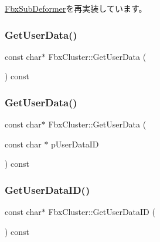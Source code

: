\hyperlink{class_fbx_sub_deformer_a80652fd0521b2ea1897e221e5ae1b5cf}{Fbx\+Sub\+Deformer}を再実装しています。

\mbox{\label{class_fbx_cluster_afd18bfe36ed5844ad6710629a68dc54f}} 
\subsubsection{\texorpdfstring{Get\+User\+Data()}{GetUserData()}\hspace{0.1cm}{\footnotesize\ttfamily [1/2]}}
{\footnotesize\ttfamily const char$\ast$ Fbx\+Cluster\+::\+Get\+User\+Data (\begin{DoxyParamCaption}{ }\end{DoxyParamCaption}) const}

\mbox{\label{class_fbx_cluster_a5630b99cd6fadf8e839543f5471154d1}} 
\subsubsection{\texorpdfstring{Get\+User\+Data()}{GetUserData()}\hspace{0.1cm}{\footnotesize\ttfamily [2/2]}}
{\footnotesize\ttfamily const char$\ast$ Fbx\+Cluster\+::\+Get\+User\+Data (\begin{DoxyParamCaption}\item[{const char $\ast$}]{p\+User\+Data\+ID }\end{DoxyParamCaption}) const}

\mbox{\label{class_fbx_cluster_ad9b7d68a8bb3ad4141ff79cc1c01304d}} 
\subsubsection{\texorpdfstring{Get\+User\+Data\+I\+D()}{GetUserDataID()}}
{\footnotesize\ttfamily const char$\ast$ Fbx\+Cluster\+::\+Get\+User\+Data\+ID (\begin{DoxyParamCaption}{ }\end{DoxyParamCaption}) const}

